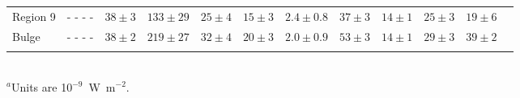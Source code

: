\begin{table}
\begin{minipage}{200mm}
\begin{tabular}{l c c  c  c  c  c  c  c  c  c c }
Region 9 &  - - - -                     & $38\pm3$          & $133\pm29$        & $25\pm4$        & $15\pm3$            & $2.4\pm0.8$        & $37\pm3$               & $14\pm1$             & $25\pm3$        & $19\pm6$        \\
Bulge       & - - - -                       & $38\pm2$           & $219\pm27$        & $32\pm4$        & $20\pm3$           & $2.0\pm0.9$        & $53\pm3$              & $14\pm1$           & $29\pm3$        & $39\pm2$       \\
\hline
 \label{PAHlinetable}
\end{tabular}\\
{$^a$Units are 10$^{-9}$~W~m$^{-2}$.}
\end{minipage}
\end{table}







